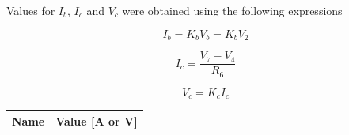 Values for $I_b$, $I_c$ and $V_c$ were obtained using the following expressions

\begin{center}
  \begin{equation}
    I_b = K_b V_b = K_b V_2
  \end{equation}
\end{center}

\begin{center}
  \begin{equation}
    I_c = \frac{V_7 - V_4}{R_6} 
  \end{equation}
\end{center}

\begin{center}
  \begin{equation}
    V_c = K_c I_c
  \end{equation}
\end{center}

\begin{table}
  \centering
  \begin{tabular}{|l|r|}
    \hline    
    {\bf Name} & {\bf Value [A or V]} \\ \hline
    
  \end{tabular}
  \label{tab:op}
\end{table}
